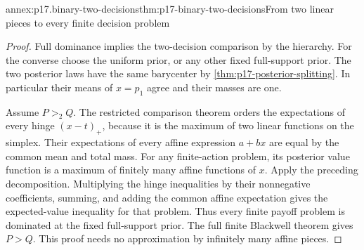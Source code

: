 \begin{annexitem}{annex:p17.binary-two-decisions}{thm:p17-binary-two-decisions}{From two linear pieces to every finite decision problem}
\begin{proof}
Full dominance implies the two-decision comparison by the hierarchy.
For the converse choose the uniform prior, or any other fixed full-support
prior. The two posterior laws have the same barycenter by
\cref{thm:p17-posterior-splitting}. In particular their means of
\(x=p_1\) agree and their masses are one.

Assume \(P>_2Q\). The restricted comparison theorem orders the expectations
of every hinge \((x-t)_+\), because it is the maximum of two linear
functions on the simplex. Their expectations of every affine expression
\(a+bx\) are equal by the common mean and total mass.
For any finite-action problem, its posterior value function is a maximum
of finitely many affine functions of \(x\). Apply the preceding
decomposition. Multiplying the hinge inequalities by their nonnegative
coefficients, summing, and adding the common affine expectation gives
the expected-value inequality for that problem.
Thus every finite payoff problem is dominated at the fixed full-support
prior. The full finite Blackwell theorem gives \(P>Q\).
This proof needs no approximation by infinitely many affine pieces.
\end{proof}
\end{annexitem}

